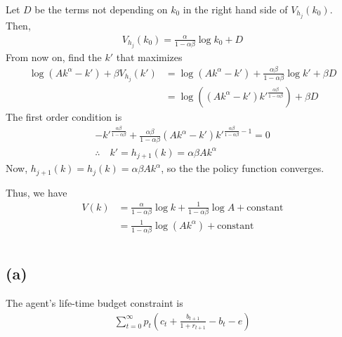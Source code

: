 \documentclass{ltjsarticle}
\begin{document}
Let $D$ be the terms not depending on $k_0$ in the right hand side of $V_{h_j}(k_0)$. Then,
\begin{gather*}
    V_{h_j}(k_0) = \frac{\alpha}{1 - \alpha \beta} \log k_0 + D
\end{gather*}
From now on, find the $k'$ that maximizes
\begin{align*}
    \log(A k^\alpha - k') + \beta V_{h_j}(k')
    &= \log(A k^\alpha - k') + \frac{\alpha \beta}{1 - \alpha \beta} \log k' + \beta D\\
    &= \log \left( (A k^\alpha - k') k'^{\frac{\alpha \beta}{1 - \alpha \beta} }\right)+ \beta D
\end{align*}
The first order condition is
\begin{gather*}
    - k'^{\frac{\alpha \beta}{1 - \alpha \beta}} + \frac{\alpha \beta}{1 - \alpha \beta}(A k^\alpha - k')k'^{\frac{\alpha \beta}{1 - \alpha \beta} -1} = 0\\
    \therefore \quad k' = h_{j+1}(k) =  \alpha \beta A k^\alpha
\end{gather*}
Now, $h_{j+1} (k) = h_{j}(k)= \alpha \beta A k^\alpha$, so the the policy function converges.

Thus, we have
\begin{align*}
    V(k) 
    &= \frac{\alpha}{1 - \alpha \beta} \log k + \frac{1}{1-\alpha\beta} \log A + \text{constant}\\
    &= \frac{1}{1 - \alpha \beta} \log (A k^\alpha) + \text{constant}
\end{align*}


\section{} %

\subsection*{(a)}
The agent's life-time budget constraint is
\begin{gather*}
    \sum_{t=0}^\infty p_t \left(c_t + \frac{b_{t+1}}{1+r_{t+1}} - b_t - e \right)
\end{gather*}
\end{document}

